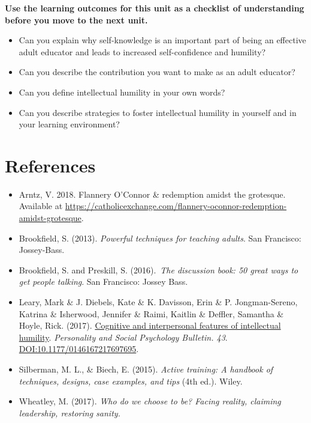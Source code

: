 \documentclass[
]{book}
\providecommand{\tightlist}{%
  \setlength{\itemsep}{0pt}\setlength{\parskip}{0pt}}
\begin{document}
\begin{progress}
\textbf{Use the learning outcomes for this unit as a checklist of
understanding before you move to the next unit.}

\begin{itemize}
\tightlist
\item
  Can you explain why self-knowledge is an important part of being an
  effective adult educator and leads to increased self-confidence and
  humility?\\
\item
  Can you describe the contribution you want to make as an adult
  educator?\\
\item
  Can you define intellectual humility in your own words?\\
\item
  Can you describe strategies to foster intellectual humility in
  yourself and in your learning environment?
\end{itemize}
\end{progress}

\hypertarget{references-4}{%
\section*{References}\label{references-4}}

\begin{itemize}
\tightlist
\item
  Arntz, V. 2018. Flannery O'Connor \& redemption amidst the grotesque. Available at \url{https://catholicexchange.com/flannery-oconnor-redemption-amidst-grotesque}.\\
\item
  Brookfield, S. (2013). \emph{Powerful techniques for teaching adults}. San Francisco: Jossey-Bass.\\
\item
  Brookfield, S. and Preskill, S. (2016).~\emph{The discussion book: 50 great ways to get people talking}. San Francisco: Jossey Bass.\\
\item
  Leary, Mark \& J. Diebels, Kate \& K. Davisson, Erin \& P. Jongman-Sereno, Katrina \& Isherwood, Jennifer \& Raimi, Kaitlin \& Deffler, Samantha \& Hoyle, Rick. (2017). \href{https://journals-sagepub-com.ezproxy.student.twu.ca/doi/pdf/10.1177/0146167217697695?}{Cognitive and interpersonal features of intellectual humility}. \emph{Personality and Social Psychology Bulletin. 43}. \url{DOI:10.1177/0146167217697695}.\\
\item
  Silberman, M. L., \& Biech, E. (2015). \emph{Active training: A handbook of techniques, designs, case examples, and tips} (4th ed.). Wiley.
\item
  Wheatley, M. (2017). \emph{Who do we choose to be? Facing reality, claiming leadership, restoring sanity.}
\end{itemize}
\end{document}
